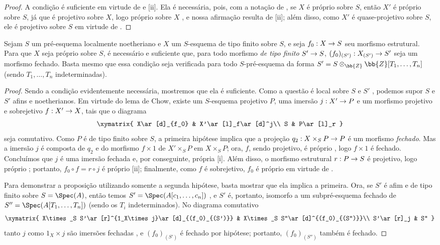 \documentclass[oneside,10pt]{amsart}
\makeatletter
\newcommand{\ega@arrow}[2]{\mathchoice{#1}{#2}{#2}{#2}}
\renewcommand{\to}{\ega@arrow{\longrightarrow}{\rightarrow}}
\newcommand{\oldpage}[2][]{\marginnote{\normalfont\footnotesize\textbf{#1}~|~#2}\ignorespaces}
\let\EGAOriginalLabel\label
\renewcommand{\label}[1]{\phantomsection\EGAOriginalLabel{#1}}
\makeatother
\begin{document}
\begin{proof}
A condição é suficiente em virtude de  e [ii].
Ela é necessária, pois, com a notação de , se $X$ é próprio sobre $S$, então $X'$ é próprio sobre $S$, já que é projetivo sobre $X$, logo próprio sobre $X$ , e nossa afirmação resulta de [ii]; além disso, como $X'$ é quase-projetivo sobre $S$, ele é projetivo sobre $S$ em virtude de .
\end{proof}

\begin{corollary}[5.6.3]
\label{II.5.6.3}
Sejam $S$ um pré-esquema localmente noetheriano e $X$ um $S$-esquema de tipo finito sobre $S$, e seja $f_0:X\to S$ seu morfismo estrutural.
Para que $X$ seja próprio sobre $S$, é necessário e suficiente que, para todo morfismo \emph{de tipo finito} $S'\to S$, $(f_0)_{(S')}:X_{(S')}\to S'$ seja um morfismo fechado.
Basta mesmo que essa condição seja verificada para todo $S$-pré-esquema da forma $S'=S\otimes_\bb{Z}\bb{Z}[T_1,\ldots,T_n]$ (sendo $T_1,\ldots,T_n$ indeterminadas).
\end{corollary}

\begin{proof}
Sendo a condição evidentemente necessária, mostremos que ela é suficiente.
Como a questão é local sobre $S$ e $S'$ , podemos supor $S$ e $S'$ afins e noetherianos.
Em virtude do lema de Chow, existe um $S$-esquema projetivo $P$, uma imersão $j:X'\to P$ e um morfismo projetivo e sobrejetivo $f:X'\to X$, tais que o diagrama
\[
  \xymatrix{
    X\ar[d]_{f_0} &
    X'\ar[l]_f\ar[d]^j\\
    S &
    P\ar[l]_r
  }
\]
seja comutativo.
Como $P$ é de tipo finito sobre $S$, a primeira hipótese implica que a projeção $q_2:X\times_S P\to P$ é um morfismo \emph{fechado}.
Mas a imersão $j$ é composta de $q_2$ e do morfismo $f\times1$ de $X'\times_S P$ em $X\times_S P$; ora, $f$, sendo projetivo, é próprio , logo $f\times1$ é fechado.
Concluímos que $j$ é uma imersão fechada e, por conseguinte, própria [i].
Além disso, o morfismo estrutural $r:P\to S$ é projetivo, logo próprio ; portanto, $f_0\circ f=r\circ j$ é próprio [ii]; finalmente, como $f$ é sobrejetivo, $f_0$ é próprio em virtude de .

Para demonstrar a proposição utilizando somente a segunda hipótese, basta mostrar que ela implica a primeira.
Ora, se $S'$ é afim e de tipo finito sobre $S=\Spec(A)$,
\oldpage[II]{110}
então temos $S'=\Spec(A[c_1,\ldots,c_n])$ , e $S'$ é, portanto, isomorfo a um subpré-esquema fechado de $S''=\Spec(A[T_1,\ldots,T_n])$ (sendo os $T_i$ indeterminados).
No diagrama comutativo
\[
  \xymatrix{
    X\times_S S'\ar[r]^{1_X\times j}\ar[d]_{(f_0)_{(S')}} &
    X\times_S S''\ar[d]^{(f_0)_{(S'')}}\\
    S'\ar[r]_j &
    S''
  }
\]
tanto $j$ como $1_X\times j$ são imersões fechadas , e $(f_0)_{(S')}$ é fechado por hipótese;
portanto, $(f_0)_{(S'')}$ também é fechado.
\end{proof}
\end{document}
